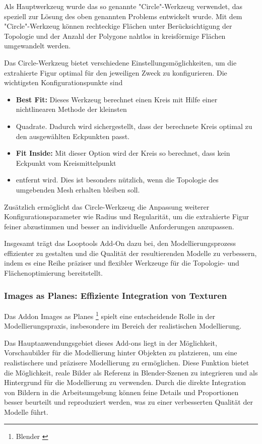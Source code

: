 Als Hauptwerkzeug wurde das so genannte "Circle"-Werkzeug verwendet, das speziell zur Lösung des oben genannten Problems
entwickelt wurde. Mit dem "Circle"-Werkzeug können rechteckige Flächen unter Berücksichtigung der Topologie und der
Anzahl der Polygone nahtlos in kreisförmige Flächen umgewandelt werden.

Das Circle-Werkzeug bietet verschiedene Einstellungsmöglichkeiten, um die extrahierte Figur optimal für den jeweiligen
Zweck zu konfigurieren. Die wichtigsten Konfigurationspunkte sind

\begin{itemize}
    \item \textbf{Best Fit:} Dieses Werkzeug berechnet einen Kreis mit Hilfe einer nichtlinearen Methode der kleinsten
    \item Quadrate. Dadurch wird sichergestellt, dass der berechnete Kreis optimal zu den ausgewählten Eckpunkten passt.
    \item \textbf{Fit Inside:} Mit dieser Option wird der Kreis so berechnet, dass kein Eckpunkt vom Kreismittelpunkt
    \item entfernt wird. Dies ist besonders nützlich, wenn die Topologie des umgebenden Mesh erhalten bleiben soll.
\end{itemize}

Zusätzlich ermöglicht das Circle-Werkzeug die Anpassung weiterer Konfigurationsparameter wie Radius und Regularität, um
die extrahierte Figur feiner abzustimmen und besser an individuelle Anforderungen anzupassen.

Insgesamt trägt das Looptools Add-On dazu bei, den Modellierungsprozess effizienter zu gestalten und die Qualität der
resultierenden Modelle zu verbessern, indem es eine Reihe präziser und flexibler Werkzeuge für die Topologie- und
Flächenoptimierung bereitstellt.

\subsubsection{Images as Planes: Effiziente Integration von Texturen}
Das Addon Images as Planes \footnote{Blender \cite{Images as Planes}} spielt eine entscheidende Rolle in der
Modellierungspraxis, insbesondere im Bereich der realistischen Modellierung.

Das Hauptanwendungsgebiet dieses Add-ons liegt in der Möglichkeit, Vorschaubilder für die Modellierung hinter Objekten
zu platzieren, um eine realistischere und präzisere Modellierung zu ermöglichen. Diese Funktion bietet die Möglichkeit,
reale Bilder als Referenz in Blender-Szenen zu integrieren und als Hintergrund für die Modellierung zu verwenden. Durch
die direkte Integration von Bildern in die Arbeitsumgebung können feine Details und Proportionen besser beurteilt und
reproduziert werden, was zu einer verbesserten Qualität der Modelle führt.

